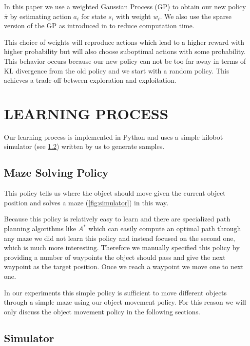 \documentclass[twoside]{article}
\begin{document}
In this paper we use a weighted Gaussian Process (GP) to obtain our new policy
$\bar{\pi}$ by estimating action $a_i$ for state $s_i$ with weight $w_i$. We
also use the sparse version of the GP as introduced in \cite{sparsegp} to reduce
computation time.

This choice of weights will reproduce actions which lead to a higher reward with
higher probability but will also choose suboptimal actions with some
probability. This behavior occurs because our new policy can not be too far away
in terms of KL divergence from the old policy and we start with a random policy.
This achieves a trade-off between exploration and exploitation.

\section{LEARNING PROCESS}

Our learning process is implemented in Python and uses a simple kilobot
simulator (see \ref{sec:simulator}) written by us to generate samples.

\subsection{Maze Solving Policy}
This policy tells us where the object should move given the current object
position and solves a maze (\autoref{fig:simulator}) in this way.

Because this policy is relatively easy to learn and there are specialized path
planning algorithms like $A^*$ which can easily compute an optimal path through
any maze we did not learn this policy and instead focused on the second one,
which is much more interesting. Therefore we manually specified this policy by
providing a number of waypoints the object should pass and give the next
waypoint as the target position. Once we reach a waypoint we move one to next
one.

In our experiments this simple policy is sufficient to move different objects
through a simple maze using our object movement policy. For this reason we will
only discuss the object movement policy in the following sections.

\subsection{Simulator}
\label{sec:simulator}

\newcommand\nkb{n_\mathit{kb}}
\newcommand\nep{n_\mathit{ep}}
\newcommand\nst{n_\mathit{st}}
\end{document}
